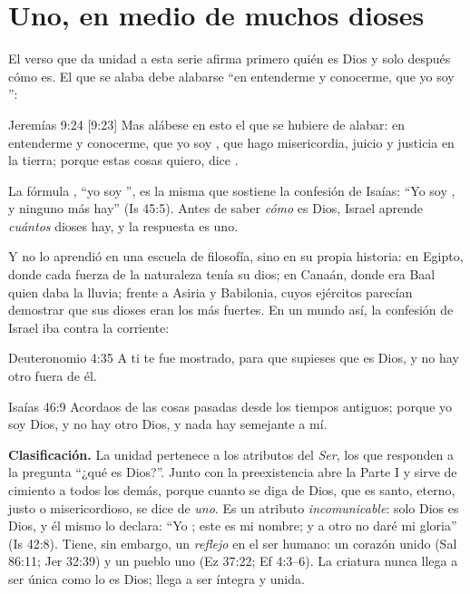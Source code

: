 
\section{Uno, en medio de muchos dioses}

El verso que da unidad a esta serie afirma primero quién es Dios y solo después cómo es. El que se alaba debe alabarse ``en entenderme y conocerme, que yo soy \SENOR'':

\begin{verso}{Jeremías 9:24 [9:23]}
Mas alábese en esto el que se hubiere de alabar: en entenderme y conocerme, que yo soy \SENOR, que hago misericordia, juicio y justicia en la tierra; porque estas cosas quiero, dice \SENOR.
\end{verso}

La fórmula , ``yo soy \SENOR'', es la misma que sostiene la confesión de Isaías: ``Yo soy \SENOR, y ninguno más hay'' (Is 45:5). Antes de saber \emph{cómo} es Dios, Israel aprende \emph{cuántos} dioses hay, y la respuesta es uno.

Y no lo aprendió en una escuela de filosofía, sino en su propia historia: en Egipto, donde cada fuerza de la naturaleza tenía su dios; en Canaán, donde era Baal quien daba la lluvia; frente a Asiria y Babilonia, cuyos ejércitos parecían demostrar que sus dioses eran los más fuertes. En un mundo así, la confesión de Israel iba contra la corriente:

\begin{verso}{Deuteronomio 4:35}
A ti te fue mostrado, para que supieses que \SENOR{} es Dios, y no hay otro fuera de él.
\end{verso}
\begin{verso}{Isaías 46:9}
Acordaos de las cosas pasadas desde los tiempos antiguos; porque yo soy Dios, y no hay otro Dios, y nada hay semejante a mí.
\end{verso}

\textbf{Clasificación.} La unidad pertenece a los atributos del \emph{Ser}, los que responden a la pregunta ``¿qué es Dios?''. Junto con la preexistencia abre la Parte I y sirve de cimiento a todos los demás, porque cuanto se diga de Dios, que es santo, eterno, justo o misericordioso, se dice de \emph{uno}. Es un atributo \emph{incomunicable}: solo Dios es Dios, y él mismo lo declara: ``Yo \SENOR; este es mi nombre; y a otro no daré mi gloria'' (Is 42:8). Tiene, sin embargo, un \emph{reflejo} en el ser humano: un corazón unido (Sal 86:11; Jer 32:39) y un pueblo uno (Ez 37:22; Ef 4:3--6). La criatura nunca llega a ser única como lo es Dios; llega a ser íntegra y unida.

